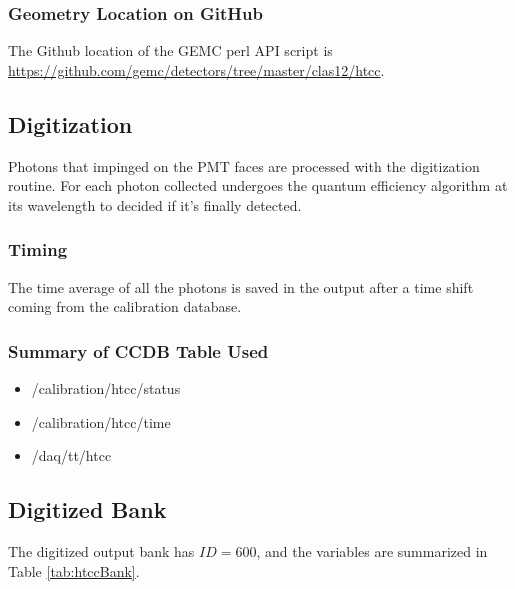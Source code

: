 \subsubsection{Geometry Location on GitHub}
The Github location of the GEMC perl API script is \url{https://github.com/gemc/detectors/tree/master/clas12/htcc}.



\subsection{Digitization}
Photons that impinged on the PMT faces are processed with the digitization routine.
For each photon collected undergoes the quantum efficiency algorithm at its wavelength to decided if it's finally detected.

\subsubsection{Timing}

The time average of all the photons is saved in the output after a time shift coming from the calibration database.


\subsubsection{Summary of CCDB Table Used}
\begin{itemize}
	\item /calibration/htcc/status
	\item /calibration/htcc/time
	\item /daq/tt/htcc
\end{itemize}

\subsection{Digitized Bank}
The digitized output bank has $ID=600$, and the variables are summarized in Table \ref{tab:htccBank}.


